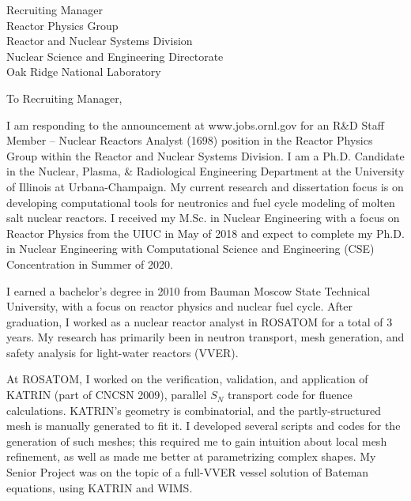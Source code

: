 \documentclass[11pt]{letter} %
\newcommand{\RecipientName}{Recruiting Manager\xspace}
\newcommand{\RecipientAddress}{Reactor Physics Group\\ Reactor and Nuclear Systems Division\\ Nuclear Science and Engineering Directorate \\ Oak Ridge National Laboratory}
\begin{document}
\begin{letter}{\RecipientName\\
        \RecipientAddress\xspace}

\address{Andrei Rykhlevskii\\
andreir2@illinois.edu\\
226 Talbot Laboratory\\
104 Wright Street\\
Urbana, IL 61801}


\opening{To \RecipientName,}

I am responding to the announcement at www.jobs.ornl.gov for an R\&D Staff Member -- Nuclear Reactors Analyst (1698) position in the Reactor Physics Group within the Reactor and Nuclear Systems Division. I am a Ph.D. Candidate in the Nuclear, Plasma, \& Radiological Engineering Department at the University of Illinois at Urbana-Champaign. My current research and dissertation focus is on 
developing computational tools for neutronics and fuel cycle modeling of molten salt nuclear reactors.  I received my M.Sc. in Nuclear Engineering with a focus on Reactor Physics from the UIUC in May of 2018 and expect to complete my Ph.D. in Nuclear Engineering with Computational Science and Engineering (CSE) Concentration in Summer of 2020.

I earned a bachelor’s degree in 2010 from Bauman Moscow State Technical 
University, with a focus on reactor physics and nuclear fuel cycle. After 
graduation, I worked as a nuclear reactor analyst in ROSATOM for a total of 3 
years. My research has primarily been in neutron transport, mesh generation, 
and safety analysis for light-water reactors (VVER).

At ROSATOM, I worked on the verification, validation, and application of KATRIN (part of CNCSN 2009),  parallel $S_N$ transport code for fluence calculations. KATRIN’s geometry is combinatorial, and the partly-structured mesh is manually generated to fit it. I developed several scripts and codes for the generation of such meshes; this required me to gain intuition about local mesh refinement, as well as  made me better at parametrizing complex shapes. My Senior Project was on the topic of a full-VVER vessel solution of Bateman equations, using KATRIN and WIMS.


\end{letter}
\end{document}

